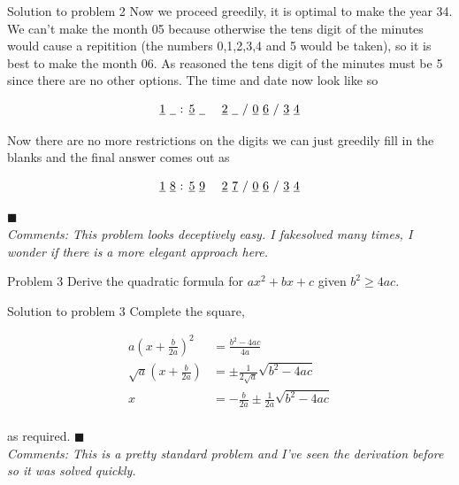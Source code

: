 \documentclass{article}
\begin{document}
\begin{solution}{Solution to problem 2}
Now we proceed greedily, it is optimal to make the year 34. We can't make
the month 05 because otherwise the tens digit of the minutes would cause
a repitition (the numbers 0,1,2,3,4 and 5 would be taken), so it is best to
make the month 06. As reasoned the tens digit of the minutes must be 5 since
there are no other options. The time and date now look like so

\large
$$
\text{
\underline{1} \underline{\phantom{a}} : \underline{5} \underline{\phantom{a}} \ \ \
\underline{2} \underline{\phantom{a}} / \underline{0} \underline{6} / \underline{3} \underline{4}
}
$$
\normalsize

Now there are no more restrictions on the digits we can just greedily fill
in the blanks and the final answer comes out as

\large
$$
\text{
\underline{1} \underline{8} : \underline{5} \underline{9} \ \ \
\underline{2} \underline{7} / \underline{0} \underline{6} / \underline{3} \underline{4}
}
$$
\normalsize

$\blacksquare$\\

\textit{Comments: This problem looks deceptively easy. I fakesolved many
times, I wonder if there is a more elegant approach here. }
\end{solution}
\vspace{0.5cm}
\newpage

\begin{problem}{Problem 3}
Derive the quadratic formula for $ax^2 + bx + c$ given $b^2 \geq 4ac$.
\end{problem}

\begin{solution}{Solution to problem 3}
Complete the square,

\[
\begin{aligned}
a\left(x+\frac{b}{2a}\right)^2 &= \frac{b^2 - 4ac}{4a} \\
\sqrt{a}\left(x+\frac{b}{2a}\right) &= \pm\frac{1}{2\sqrt{a}}\sqrt{b^2-4ac}
\\
x &= -\frac{b}{2a} \pm \frac{1}{2a}\sqrt{b^2 - 4ac}\\
\end{aligned}
\]

as required. $\blacksquare$\\

\textit{Comments: This is a pretty standard problem and I've seen the
derivation before so it was solved quickly.}
\end{solution}
\vspace{0.5cm}
\newpage
\end{document}
